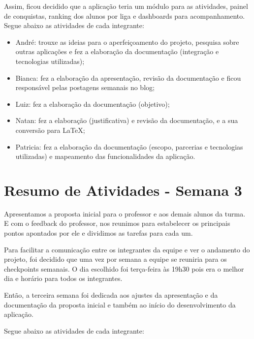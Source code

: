 \documentclass[
    12pt,               %
    openright,          %
    oneside,
    a4paper,            %
    english,            %
    brazil              %
    ]{ifsp-spo-inf-ctds} %
\begin{document}
\begin{apendicesenv}
Assim, ficou decidido que a aplicação teria um módulo para as atividades, painel de conquistas, ranking dos alunos por liga e \glspl{dashboard} para acompanhamento.
Segue abaixo as atividades de cada integrante:

\begin{itemize}
\item André: trouxe as ideias para o aperfeiçoamento do projeto, pesquisa sobre outras aplicações e fez a elaboração da documentação (integração e tecnologias utilizadas);
\item Bianca: fez a elaboração da apresentação, revisão da documentação e ficou responsável pelas postagens semanais no blog;
\item Luiz: fez a elaboração da documentação (objetivo);
\item Natan: fez a elaboração (justificativa) e revisão da documentação, e a sua conversão para LaTeX;
\item Patricia: fez a elaboração da documentação (escopo, parcerias e tecnologias utilizadas) e mapeamento das funcionalidades da aplicação.
\end{itemize}

\section{Resumo de Atividades - Semana 3}
Apresentamos a proposta inicial para o professor e aos demais alunos da turma. E com o \gls{feedback} do professor, nos reunimos para estabelecer os principais pontos apontados por ele e dividimos as tarefas para cada um.

Para facilitar a comunicação entre os integrantes da equipe e ver o andamento do projeto, foi decidido que uma vez por semana a equipe se reuniria para os \glspl{checkpoint} semanais. O dia escolhido foi terça-feira às 19h30 pois era o melhor dia e horário para todos os integrantes. 

Então, a terceira semana foi dedicada aos ajustes da apresentação e da documentação da proposta inicial e também ao início do desenvolvimento da aplicação.

Segue abaixo as atividades de cada integrante:


\end{apendicesenv}
\end{document}
